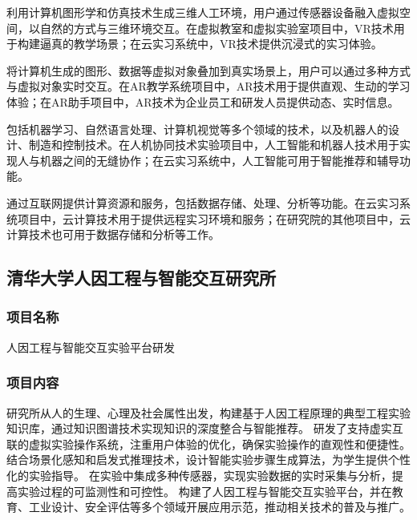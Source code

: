 
利用计算机图形学和仿真技术生成三维人工环境，用户通过传感器设备融入虚拟空间，以自然的方式与三维环境交互。在虚拟教室和虚拟实验室项目中，VR技术用于构建逼真的教学场景；在云实习系统中，VR技术提供沉浸式的实习体验。


将计算机生成的图形、数据等虚拟对象叠加到真实场景上，用户可以通过多种方式与虚拟对象实时交互。在AR教学系统项目中，AR技术用于提供直观、生动的学习体验；在AR助手项目中，AR技术为企业员工和研发人员提供动态、实时信息。


包括机器学习、自然语言处理、计算机视觉等多个领域的技术，以及机器人的设计、制造和控制技术。在人机协同技术实验项目中，人工智能和机器人技术用于实现人与机器之间的无缝协作；在云实习系统中，人工智能可用于智能推荐和辅导功能。

通过互联网提供计算资源和服务，包括数据存储、处理、分析等功能。在云实习系统项目中，云计算技术用于提供远程实习环境和服务；在研究院的其他项目中，云计算技术也可用于数据存储和分析等工作。

\subsection{清华大学人因工程与智能交互研究所}\label{清华大学人因工程与智能交互研究所}


\subsubsection{项目名称}

人因工程与智能交互实验平台研发

\subsubsection{项目内容}

研究所从人的生理、心理及社会属性出发，构建基于人因工程原理的典型工程实验知识库，通过知识图谱技术实现知识的深度整合与智能推荐。
研发了支持虚实互联的虚拟实验操作系统，注重用户体验的优化，确保实验操作的直观性和便捷性。
结合场景化感知和启发式推理技术，设计智能实验步骤生成算法，为学生提供个性化的实验指导。
在实验中集成多种传感器，实现实验数据的实时采集与分析，提高实验过程的可监测性和可控性。
构建了人因工程与智能交互实验平台，并在教育、工业设计、安全评估等多个领域开展应用示范，推动相关技术的普及与推广。

